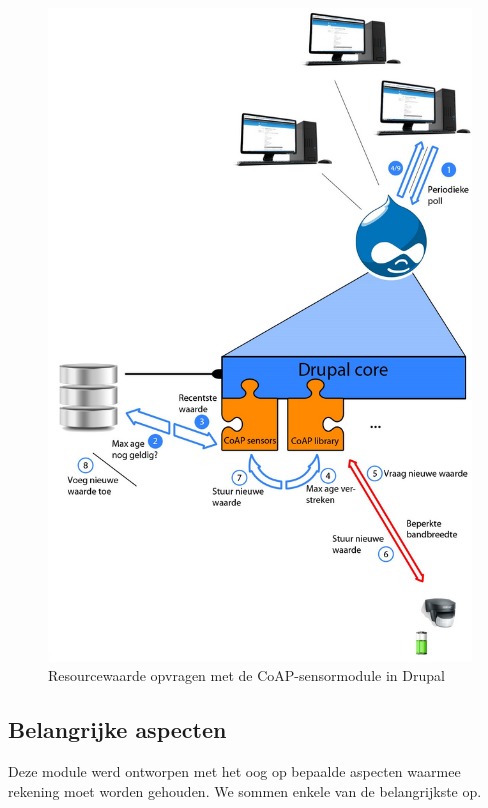 \begin{figure}
\includegraphics[width=1\textwidth]{fig/architectuur}
\caption{Resourcewaarde opvragen met de CoAP-sensormodule in Drupal}
\label{fig:architectuur}
\end{figure}

\subsection{Belangrijke aspecten}

Deze module werd ontworpen met het oog op bepaalde aspecten waarmee rekening moet worden gehouden. We sommen enkele van de belangrijkste op.

